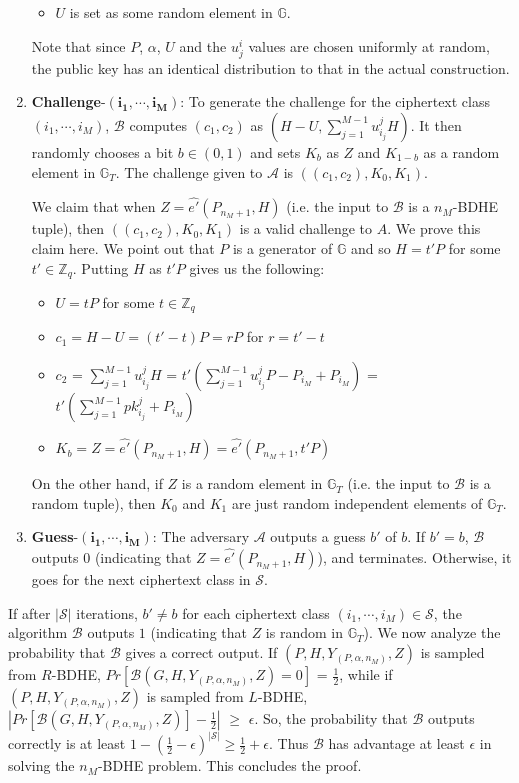 \begin{enumerate}
\begin{itemize}
  \item $U$ is set as some random element in $\mathbb{G}$.
 \end{itemize}
 
 Note that since $P$, $\alpha$, $U$ and the $u^{i}_{j}$ values are chosen uniformly at random, the public key has an identical distribution to that in the actual construction.
 
 \item \textbf{Challenge}-$\mathbf{(i_1,\cdots,i_M)}$: To generate the challenge for the ciphertext class $(i_1,\cdots,i_M)$, $\mathcal{B}$ computes $(c_1,c_2)$ as $(H-U,\sum_{j=1}^{M-1}u^{j}_{i_j}H)$. It then randomly chooses a bit $b\in{(0,1)}$ and sets $K_b$ as $Z$ and $K_{1-b}$ as a random element in $\mathbb{G}_T$. The challenge given to $\mathcal{A}$ is $((c_1,c_2),K_0,K_1)$. 
 
 We claim that when $Z=\hat{e'}(P_{n_M+1},H)$ (i.e. the input to $\mathcal{B}$ is a $n_M$-BDHE tuple), then $((c_1,c_2),K_0,K_1)$ is a valid challenge to $A$. We prove this claim here. We point out that $P$ is a generator of $\mathbb{G}$ and so $H=t'P$ for some $t'\in\mathbb{Z}_q$. Putting $H$ as $t'P$ gives us the following:
 \begin{itemize}
  \item  $U=tP$ for some $t\in\mathbb{Z}_q$
  \item $c_1=H-U=(t'-t)P=rP$ for $r=t'-t$
  \item
    $c_2$ = $\sum_{j=1}^{M-1}u^{j}_{i_j}H$ = $t'(\sum_{j=1}^{M-1}u^{j}_{i_j}P-P_{i_M}+P_{i_M})$ = $t'(\sum_{j=1}^{M-1}pk^{j}_{i_j}+P_{i_M})$
  \item $K_b=Z=\hat{e'}(P_{n_M+1},H)=\hat{e'}(P_{n_M+1},t'P)$
 \end{itemize}
 On the other hand, if $Z$ is a random element in $\mathbb{G}_T$ (i.e. the input to $\mathcal{B}$ is a random tuple), then $K_0$ and $K_1$ are just random independent elements of $\mathbb{G}_T$.
 
 \item\textbf{Guess}-$\mathbf{(i_1,\cdots,i_M)}$: The adversary $\mathcal{A}$ outputs a guess $b'$ of $b$. If $b' = b$, $\mathcal{B}$ outputs $0$ (indicating that $Z = \hat{e'}(P_{n_M+1},H)$), and terminates. Otherwise, it goes for the next ciphertext class in $\mathcal{S}$.
\end{enumerate}
If after $|\mathcal{S}|$ iterations, $b' \neq b$ for each ciphertext class $(i_1,\cdots,i_M)\in\mathcal{S}$, the algorithm $\mathcal{B}$ outputs $1$ (indicating that $Z$ is random in $\mathbb{G}_T$). We now analyze the probability that $\mathcal{B}$ gives a correct output. If $(P,H,Y_{(P,\alpha,n_M)},Z)$ is sampled from $R$-BDHE, $Pr[\mathcal{B}(G,H,Y_{(P,\alpha,n_M)},Z)=0]$ = $\frac{1}{2}$, while if $(P,H,Y_{(P,\alpha,n_M)},Z)$ is sampled from $L$-BDHE, $|Pr[\mathcal{B}(G,H,Y_{(P,\alpha,n_M)},Z)]-\frac{1}{2}|$ $\geq$ $\epsilon$. So, the probability that $\mathcal{B}$ outputs correctly is at least $1-(\frac{1}{2}-\epsilon)^{|\mathcal{S}|} \geq \frac{1}{2}+\epsilon$. Thus $\mathcal{B}$ has advantage at least $\epsilon$ in solving the $n_M$-BDHE problem. This concludes the proof. 


